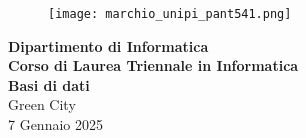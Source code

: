 \begin{titlepage} %
	\begin{figure}[t] %
		\centering\texttt{[image: marchio\_unipi\_pant541.png]}
	\end{figure}
	\vspace{20mm}
	
	\begin{Large}
		\begin{center}
			\textbf{Dipartimento di Informatica\\ Corso di Laurea Triennale in Informatica\\}
			\vspace{20mm}
			{\huge{\bf Basi di dati}}\\
			\vspace{5mm}
			{\LARGE{Green City}}\\
			{\large{7 Gennaio 2025}}
		\end{center}
	\end{Large}
	
	
	\vspace{36mm}
	
\end{titlepage}